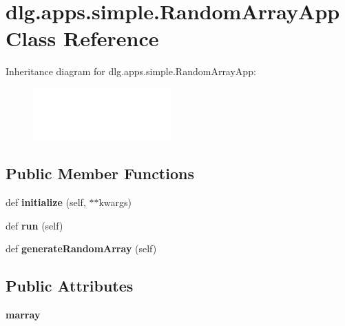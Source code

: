 \hypertarget{classdlg_1_1apps_1_1simple_1_1_random_array_app}{}\section{dlg.\+apps.\+simple.\+Random\+Array\+App Class Reference}
\label{classdlg_1_1apps_1_1simple_1_1_random_array_app}
Inheritance diagram for dlg.\+apps.\+simple.\+Random\+Array\+App\+:\begin{figure}[H]
\begin{center}
\leavevmode
\includegraphics[height=2.000000cm]{classdlg_1_1apps_1_1simple_1_1_random_array_app}
\end{center}
\end{figure}
\subsection*{Public Member Functions}
\begin{DoxyCompactItemize}
\item 
\mbox{\label{classdlg_1_1apps_1_1simple_1_1_random_array_app_a7af33812aa34879859acfcbc903aaab4}} 
def {\bfseries initialize} (self, $\ast$$\ast$kwargs)
\item 
\mbox{\label{classdlg_1_1apps_1_1simple_1_1_random_array_app_abd114510ece90c24417811df5b58421e}} 
def {\bfseries run} (self)
\item 
\mbox{\label{classdlg_1_1apps_1_1simple_1_1_random_array_app_ab235a46cb3f6b14b410d16250320e941}} 
def {\bfseries generate\+Random\+Array} (self)
\end{DoxyCompactItemize}
\subsection*{Public Attributes}
\begin{DoxyCompactItemize}
\item 
\mbox{\label{classdlg_1_1apps_1_1simple_1_1_random_array_app_aab361830b9d1d62a0b57d00047dd713b}} 
{\bfseries marray}
\end{DoxyCompactItemize}
